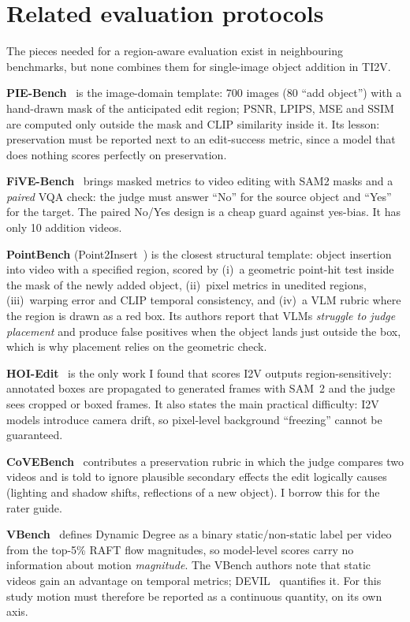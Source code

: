 \documentclass[10pt,a4paper]{article}
\begin{document}
\section{Related evaluation protocols}

The pieces needed for a region-aware evaluation exist in neighbouring benchmarks, but none combines them for single-image object addition in TI2V.

\textbf{PIE-Bench}~\cite{piebench} is the image-domain template: 700 images (80 ``add object'') with a hand-drawn mask of the anticipated edit region; PSNR, LPIPS, MSE and SSIM are computed only outside the mask and CLIP similarity inside it. Its lesson: preservation must be reported next to an edit-success metric, since a model that does nothing scores perfectly on preservation.

\textbf{FiVE-Bench}~\cite{five} brings masked metrics to video editing with SAM2 masks and a \emph{paired} VQA check: the judge must answer ``No'' for the source object and ``Yes'' for the target. The paired No/Yes design is a cheap guard against yes-bias. It has only 10 addition videos.

\textbf{PointBench} (Point2Insert~\cite{point2insert}) is the closest structural template: object insertion into video with a specified region, scored by (i)~a geometric point-hit test inside the mask of the newly added object, (ii)~pixel metrics in unedited regions, (iii)~warping error and CLIP temporal consistency, and (iv)~a VLM rubric where the region is drawn as a red box. Its authors report that VLMs \emph{struggle to judge placement} and produce false positives when the object lands just outside the box, which is why placement relies on the geometric check.

\textbf{HOI-Edit}~\cite{hoiedit} is the only work I found that scores I2V outputs region-sensitively: annotated boxes are propagated to generated frames with SAM~2 and the judge sees cropped or boxed frames. It also states the main practical difficulty: I2V models introduce camera drift, so pixel-level background ``freezing'' cannot be guaranteed.

\textbf{CoVEBench}~\cite{covebench} contributes a preservation rubric in which the judge compares two videos and is told to ignore plausible secondary effects the edit logically causes (lighting and shadow shifts, reflections of a new object). I borrow this for the rater guide.

\textbf{VBench}~\cite{vbench} defines Dynamic Degree as a binary static/non-static label per video from the top-5\% RAFT flow magnitudes, so model-level scores carry no information about motion \emph{magnitude}. The VBench authors note that static videos gain an advantage on temporal metrics; DEVIL~\cite{devil} quantifies it. For this study motion must therefore be reported as a continuous quantity, on its own axis.
\end{document}
